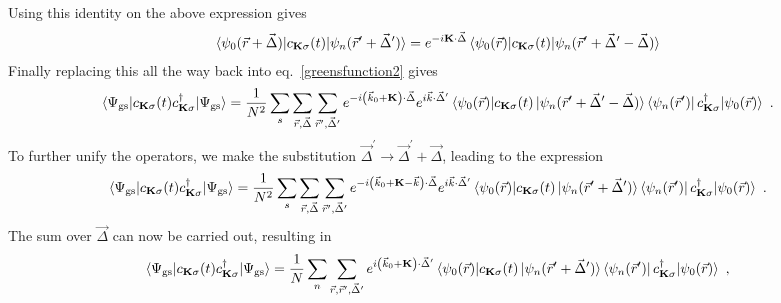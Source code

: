 \documentclass[reprint,hidelinks,onecolumn]{revtex4-2}
\begin{document}
Using this identity on the above expression gives
\begin{equation}\begin{aligned}
	\braket{\psi_{0}(\vec r+\vec \Delta) | c_{{\bf K}\sigma}(t) | \psi_n(\vec r^\prime+\vec \Delta^\prime)} = e^{-i{\bf K} \cdot \vec \Delta}\braket{\psi_{0}(\vec r) | c_{{\bf K}\sigma}(t) | \psi_n(\vec r^\prime+\vec \Delta^\prime - \vec \Delta)}
\end{aligned}\end{equation}
Finally replacing this all the way back into eq.~\ref{greensfunction2} gives
	\begin{equation}\begin{aligned}
		\braket{\Psi_\text{gs} | c_{{\bf K}\sigma}(t) c^\dagger_{{\bf K}\sigma} | \Psi_\text{gs}} = \frac{1}{N^2}\sum_s\sum_{\vec r,\vec \Delta}\sum_{\vec r^\prime,\vec \Delta^\prime}e^{-i\left(\vec k_0 + {\bf K}\right)\cdot\vec\Delta} e^{i\vec k\cdot\vec\Delta^\prime}\braket{\psi_{0}(\vec r) | c_{{\bf K}\sigma}(t) \ket{\psi_n(\vec r^\prime+\vec \Delta^\prime - \vec\Delta)}\bra{\psi_n(\vec r^\prime)} c^\dagger_{{\bf K}\sigma} | \psi_{0}(\vec r)}~.
\end{aligned}\end{equation}
To further unify the operators, we make the substitution \(\vec \Delta^\prime \to \vec \Delta^\prime + \vec \Delta\), leading to the expression
	\begin{equation}\begin{aligned}
		\braket{\Psi_\text{gs} | c_{{\bf K}\sigma}(t) c^\dagger_{{\bf K}\sigma} | \Psi_\text{gs}} = \frac{1}{N^2}\sum_s\sum_{\vec r,\vec \Delta}\sum_{\vec r^\prime,\vec \Delta^\prime}e^{-i\left(\vec k_0 + {\bf K} - \vec k\right)\cdot\vec\Delta} e^{i\vec k\cdot\vec\Delta^\prime}\braket{\psi_{0}(\vec r) | c_{{\bf K}\sigma}(t) \ket{\psi_n(\vec r^\prime+\vec \Delta^\prime)}\bra{\psi_n(\vec r^\prime)} c^\dagger_{{\bf K}\sigma} | \psi_{0}(\vec r)}~.
\end{aligned}\end{equation}
The sum over \(\vec\Delta\) can now be carried out, resulting in
\begin{equation}\begin{aligned}\label{greensfunction3}
		\braket{\Psi_\text{gs} | c_{{\bf K}\sigma}(t) c^\dagger_{{\bf K}\sigma} | \Psi_\text{gs}} = \frac{1}{N}\sum_n\sum_{\vec r,\vec r^\prime,\vec \Delta^\prime} e^{i\left( \vec k_0 + {\bf K} \right) \cdot\vec\Delta^\prime}\braket{\psi_{0}(\vec r) | c_{{\bf K}\sigma}(t) \ket{\psi_n(\vec r^\prime+\vec \Delta^\prime)}\bra{\psi_n(\vec r^\prime)} c^\dagger_{{\bf K}\sigma} | \psi_{0}(\vec r)}~,
\end{aligned}\end{equation}
\end{document}
